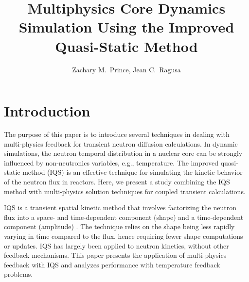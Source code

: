 \documentclass{anstrans}
\title{Multiphysics Core Dynamics Simulation Using the Improved Quasi-Static Method}
\author{Zachary M.~Prince, Jean C.~Ragusa}
\institute{Department of Nuclear Engineering, Texas A\&M University, College Station, TX}
\begin{document}
\vspace*{-42pt}
\begin{strip}
\vspace*{14pt}
\end{strip}


\section{Introduction}

The purpose of this paper is to introduce several techniques in dealing with multi-physics feedback for transient neutron diffusion calculations.  In dynamic simulations, the neutron temporal distribution in a nuclear core can be strongly influenced by non-neutronics variables, e.g., temperature. The improved quasi-static method (IQS) is an effective technique for simulating the kinetic behavior of the neutron flux in reactors. Here, we present a study combining the IQS method with multi-physics solution techniques for coupled transient calculations.

IQS is a transient spatial kinetic method that involves factorizing the neutron flux into a space- and time-dependent component (shape) and a time-dependent component (amplitude) \cite{Ott_1966,Dulla2008}. The technique relies on the shape being less rapidly varying in time compared to the flux, hence requiring fewer shape computations or updates. IQS has largely been applied to neutron kinetics, without other feedback mechanisms. This paper presents the application of multi-physics feedback with IQS and analyzes performance with temperature feedback problems.
\end{document}
